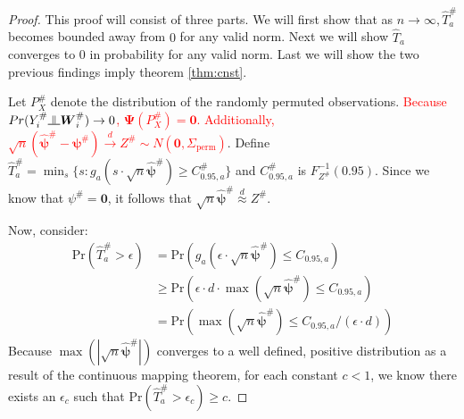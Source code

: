 \documentclass{article}
\newcommand{\sh}{\textcolor{red}}
\newcommand{\pr}{\text{Pr}}
\newcommand{\indep}{\raisebox{0.05em}{\rotatebox[origin=c]{90}{$\models$}}}
\newcommand{\rvo}{X}
\begin{document}
\begin{proof}
This proof will consist of three parts.  We will first show that as $n \to \infty, \hat{T}_a^\#$ becomes bounded away from $0$ for any valid norm.  Next we will show $\hat{T}_a$ converges to $0$ in probability for any valid norm.  Last we will show the two previous findings imply theorem \ref{thm:cnst}.

Let $P^\#_{\rvo}$ denote the distribution of the randomly permuted observations.  \sh{Because $Pr(Y^{\#}_i \indep \boldsymbol{W}^\#_{i}) \to 0$, $\boldsymbol{\Psi}(P^\#_{\rvo}) = \boldsymbol{0}$.  Additionally, $\sqrt{n}\left(\hat{\boldsymbol{\psi}}^\# -\boldsymbol{\psi}^\# \right) \xrightarrow{d} Z^\# \sim N\left(\boldsymbol{0}, \Sigma_{\text{perm}}\right)$}.
Define $\hat{T}_a^\# = \min_s\{s : g_a(s \cdot \sqrt{n}\hat{\boldsymbol{\psi}}^\#) \geq C_{0.95, a}^\# \}$ and $C^\#_{0.95, a}$ is $F^{-1}_{Z^\#}(0.95)$.  Since we know that $\psi^\# = \boldsymbol{0}$, it follows that $\sqrt{n}\hat{\boldsymbol{\psi}}^\# \overset{d}{\approx} Z^\#$.

Now, consider:
\begin{align*}
	\pr\left(\hat{T}^\#_a  > \epsilon\right) &= \pr\left(g_a\left(\epsilon \cdot \sqrt{n}\hat{\boldsymbol{\psi}}^\#\right) \leq C_{0.95, a}\right)\\
	& \geq \pr\left(\epsilon \cdot d \cdot  \max\left(\sqrt{n} \hat{\boldsymbol{\psi}}^\# \right)\leq C_{0.95, a}\right)\\
	& = \pr\left( \max\left(\sqrt{n} \hat{\boldsymbol{\psi}}^\# \right)\leq C_{0.95, a}/(\epsilon \cdot d)\right)
\end{align*}
Because $\max\left(\left|\sqrt{n} \hat{\boldsymbol{\psi}}^\#\right|\right)$ converges to a well defined, positive distribution as a result of the continuous mapping theorem, for each constant $c < 1$, we know there exists an $\epsilon_c$ such that $\pr\left(\hat{T}^\#_a  > \epsilon_c\right) \geq c$.  



\end{proof}
\end{document}
